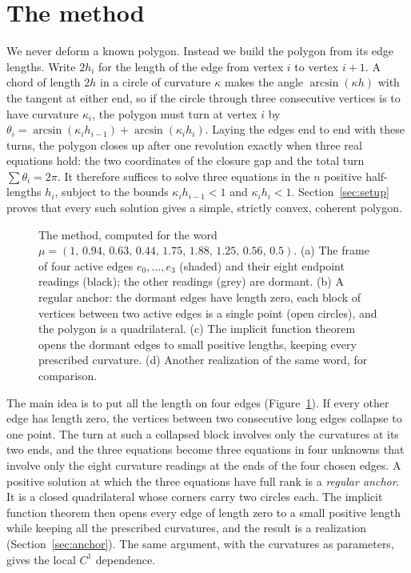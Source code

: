 \section{The method}\label{sec:method}

We never deform a known polygon. Instead we build the polygon from its edge
lengths. Write $2h_i$ for the length of the edge from vertex $i$ to vertex
$i+1$. A chord of length $2h$ in a circle of curvature $\kappa$ makes the angle
$\arcsin(\kappa h)$ with the tangent at either end, so if the circle through
three consecutive vertices is to have curvature $\kappa_i$, the polygon must
turn at vertex $i$ by
$\theta_i=\arcsin(\kappa_ih_{i-1})+\arcsin(\kappa_ih_i)$. Laying the edges
end to end with these turns, the polygon closes up after one revolution
exactly when three real equations hold: the two coordinates of the closure
gap and the total turn $\sum\theta_i=2\pi$. It therefore suffices to solve
three equations in the $n$ positive half-lengths $h_i$, subject to the bounds
$\kappa_i h_{i-1}<1$ and $\kappa_i h_i<1$. Section~\ref{sec:setup} proves
that every such solution gives a simple, strictly convex, coherent polygon.

\begin{figure}[t]
\centering
{}
\caption{The method, computed for the word
$\mu=(1,\allowbreak\,0.94,\allowbreak\,0.63,\allowbreak\,0.44,\allowbreak\,1.75,\allowbreak\,1.88,\allowbreak\,1.25,\allowbreak\,0.56,\allowbreak\,0.5)$.
(a) The frame of four active edges $e_0,\dots,e_3$ (shaded) and their eight
endpoint readings (black); the other readings (grey) are dormant.
(b) A regular anchor: the dormant edges have length zero, each block of
vertices between two active edges is a single point (open circles), and the
polygon is a quadrilateral. (c) The implicit function theorem opens the
dormant edges to small positive lengths, keeping every prescribed curvature.
(d) Another realization of the same word, for comparison.}
\label{fig:method}
\end{figure}

The main idea is to put all the length on four edges
(Figure~\ref{fig:method}). If every other edge has length zero, the vertices
between two consecutive long edges collapse to one point. The turn at such a
collapsed block involves only the curvatures at its two ends, and the three
equations become three equations in four unknowns that involve only the
eight curvature readings at the ends of the four chosen edges. A positive
solution at which the three equations have full rank is a \emph{regular
anchor}. It is a closed quadrilateral whose corners carry two circles each.
The implicit function theorem then opens every edge of length zero to a small
positive length while keeping all the prescribed curvatures, and the result
is a realization (Section~\ref{sec:anchor}). The same argument, with the
curvatures as parameters, gives the local $C^1$ dependence.

